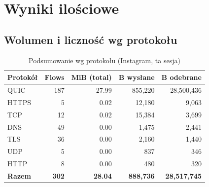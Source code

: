 \section{Wyniki ilościowe}
\subsection{Wolumen i liczność wg protokołu}
\begin{table}[htbp]
  \centering
  \caption{Podsumowanie wg protokołu (Instagram, ta sesja)}
  \label{tab:insta-proto}
  \begin{tabular}{lrrrr}
    \toprule
    \textbf{Protokół} & \textbf{Flows} & \textbf{MiB (total)} & \textbf{B wysłane} & \textbf{B odebrane} \\
    \midrule
    QUIC  & 187 & 27.99 & 855{,}220 & 28{,}500{,}436 \\
    HTTPS & 5   & 0.02  & 12{,}180  & 9{,}063 \\
    TCP   & 12  & 0.02  & 15{,}384  & 3{,}699 \\
    DNS   & 49  & 0.00  & 1{,}475   & 2{,}441 \\
    TLS   & 36  & 0.00  & 2{,}160   & 1{,}440 \\
    UDP   & 5   & 0.00  & 837       & 346 \\
    HTTP  & 8   & 0.00  & 480       & 320 \\
    \midrule
    \textbf{Razem} & \textbf{302} & \textbf{28.04} & \textbf{888{,}736} & \textbf{28{,}517{,}745} \\
    \bottomrule
  \end{tabular}
\end{table}

